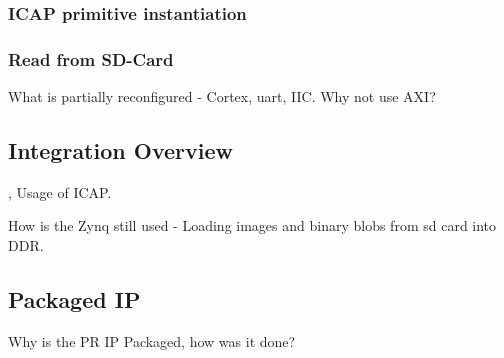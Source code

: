 \subsubsection{\gls{ICAP} primitive instantiation}
\subsubsection{Read from SD-Card}
What is partially reconfigured - Cortex, uart, IIC.
Why not use AXI?

\subsection{Integration Overview}
\cite{xilinx_vivado_2018-1}, \cite{xilinx_vivado_2018}
Usage of \gls{ICAP}.

How is the Zynq still used - Loading images and binary blobs from sd card into DDR.

\subsection{Packaged IP}
Why is the PR IP Packaged, how was it done? \cite{xilinx_ug1118-vivado-creating-packaging-custom-ip.pdf_nodate}
